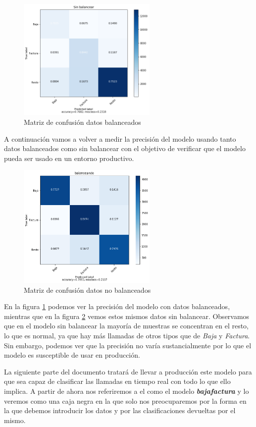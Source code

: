 \begin{figure}[!ht]
	\centering
	\includegraphics[width=0.6\textwidth]{images/super/mvp_mat1}
	\caption{Matriz de confusión datos balanceados}
	\label{fig:mvp_mat1}
\end{figure}


A continuación vamos a volver a medir la precisión del modelo usando tanto datos balanceados como sin balancear con el objetivo de verificar que el modelo pueda ser usado en un entorno productivo.




\begin{figure}[!ht]
	\centering
	\includegraphics[width=0.6\textwidth]{images/super/mvp_mat2}
	\caption{Matriz de confusión datos no balanceados}
	\label{fig:mvp_mat2}
\end{figure}

En la figura \ref{fig:mvp_mat1} podemos ver la precisión del modelo con datos balanceados, mientras que en la figura  \ref{fig:mvp_mat2} vemos estos mismos datos sin balancear. Observamos que en el modelo sin balancear la mayoría de muestras se concentran en el resto, lo que es normal, ya que hay más llamadas de otros tipos que de \textit{Baja} y \textit{Factura}. Sin embargo, podemos ver que la precisión no varía sustancialmente por lo que el modelo es susceptible de usar en producción.


La siguiente parte del documento tratará de llevar a producción este modelo para que sea capaz de clasificar las llamadas en tiempo real con todo lo que ello implica. A partir de ahora nos referiremos a el como el modelo \textit{\textbf{bajafactura}} y lo veremos como una caja negra en la que solo nos preocuparemos por la forma en la que debemos introducir los datos y por las clasificaciones devueltas por el mismo.


